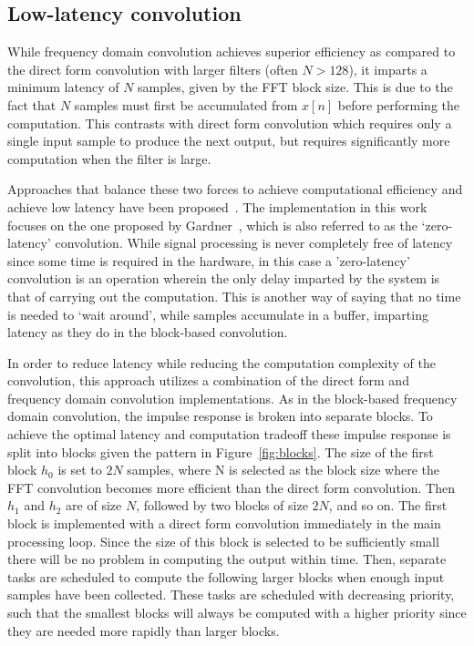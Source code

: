 \documentclass{article}
\begin{document}
\subsection{Low-latency convolution}

While frequency domain convolution achieves superior efficiency as compared to the direct form convolution with larger filters (often $N > 128$),
it imparts a minimum latency of $N$ samples, given by the FFT block size. 
This is due to the fact that $N$ samples must first be accumulated from $x[n]$ before performing the computation. 
This contrasts with direct form convolution which requires only a single input sample to produce the next output, 
but requires significantly more computation when the filter is large. 

Approaches that balance these two forces to achieve computational efficiency and achieve low latency have been proposed~\cite{gardner1994efficient, muller1999low, hurchalla2010time, wefers2015partitioned}.
The implementation in this work focuses on the one proposed by Gardner~\cite{gardner1994efficient}, 
which is also referred to as the `zero-latency' convolution.
While signal processing is never completely free of latency since some time is required in the hardware, 
in this case a 'zero-latency' convolution is an operation wherein the only delay imparted by the system is that of carrying out the computation.
This is another way of saying that no time is needed to `wait around', while samples accumulate in a buffer, imparting latency as they do in the block-based convolution. 

In order to reduce latency while reducing the computation complexity of the convolution, 
this approach utilizes a combination of the direct form and frequency domain convolution implementations. 
As in the block-based frequency domain convolution, the impulse response is broken into separate blocks. 
To achieve the optimal latency and computation tradeoff these impulse response is split into blocks given the pattern in Figure~\ref{fig:blocks}.
The size of the first block $h_0$ is set to $2N$ samples, where N is selected as the block size where the FFT convolution becomes more efficient than the direct form convolution. 
Then $h_1$ and $h_2$ are of size $N$, followed by two blocks of size $2N$, and so on.
The first block is implemented with a direct form convolution immediately in the main processing loop. 
Since the size of this block is selected to be sufficiently small there will be no problem in computing the output within time. 
Then, separate tasks are scheduled to compute the following larger blocks when enough input samples have been collected. 
These tasks are scheduled with decreasing priority, such that the smallest blocks will always be computed with a higher priority 
since they are needed more rapidly than larger blocks. 
\end{document}
